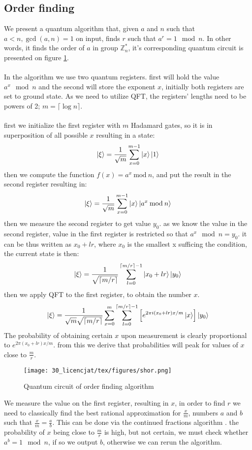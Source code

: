 \subsection{Order finding}
We present a quantum algorithm that, given $a$ and $n$ such that $a<n, \gcd(a,n)=1$ on input, finds $r$ such that $a ^r=1 \mod n$. In other words, it finds the order of $a$ in group $\mathbb{Z}_n^*$, it's corresponding quantum circuit is presented on figure \ref{fig:shor}.
\\\\
In the algorithm we use two quantum registers. first will hold the value $a^x \mod n$ and the second will store the exponent $x$, initially both registers are set to ground state. As we need to utilize QFT, the registers' lengths need to be powers of 2; $m=\lceil\log n\rceil$.\\\\
first we initialize the first register with $m$ Hadamard gates, so it is in superposition of all possible $x$ resulting in a state:
\begin{align*}
    \ket{\xi}=\frac{1}{\sqrt{m}}\sum_{x=0}^{m-1}\ket{x}\ket{1}
\end{align*}
then we compute the function $f(x)=a^x \: \text{mod}\: n$, and put the result in the second register resulting in:
\begin{align*}
    \ket{\xi}=\frac{1}{\sqrt{m}}\sum_{x=0}^{m-1}\ket{x}\ket{a^x\: \text{mod}\: n}
\end{align*}
then we measure the second register to get value $y_0$. as we know the value in the second register, value in the first register is restricted so that $a^x \mod{n}=y_0$. it can be thus written as $x_0+lr$, where $x_0$ is the smallest x sufficing the condition, the current state is then:
\begin{align*}
  \ket{\xi}=\frac{1}{\sqrt{\lceil m/r \rceil}}\sum_{l=0}^{\lceil m/r \rceil-1}\ket{x_0 + lr}\ket{y_0}
\end{align*}
then we apply QFT to the first register, to obtain the number $x$. 
\begin{align*}
  \ket{\xi}=\frac{1}{\sqrt{m}\sqrt{\lceil m/r \rceil}}\sum_{x=0}^m\sum_{l=0}^{\lceil m/r \rceil-1}\left[e^{2\pi i (x_0+lr)x/m}\ket{x}\right]\ket{y_0}
\end{align*}  
The probability of obtaining certain $x$ upon measurement is clearly proportional to $e^{2\pi (x_0+lr)x/m}$. from this we derive that probabilities will peak for values of $x$ close to $\frac{m}{r}$.
\begin{figure}[ht!]
    \centering
    \texttt{[image: 30\_licencjat/tex/figures/shor.png]}
    \caption{Quantum circuit of order finding algorithm}
    \label{fig:shor}
\end{figure}
\newpage
We measure the value on the first register, resulting in $x$, in order to find $r$ we need to classically find the best rational approximation for $\frac{x}{m}$, numbers $a$ and $b$ such that $\frac{x}{m}=\frac{a}{b}$. This can be done via the continued fractions algorithm \cite{continued_fractions}. the probability of $x$ being close to $\frac{m}{r}$ is high, but not certain, we must check whether $a^b=1 \mod{n}$, if so we output $b$, otherwise we can rerun the algorithm. 


